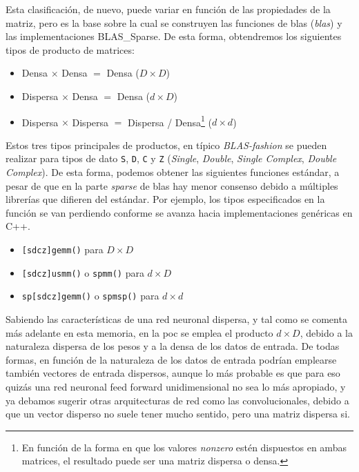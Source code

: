 Esta clasificación, de nuevo, puede variar en función de las propiedades de la matriz, pero es la base sobre la cual se construyen las funciones de \acrshort{blas} (\textit{\acrlong{blas}}) y las implementaciones BLAS\_Sparse. De esta forma, obtendremos los siguientes tipos de producto de matrices:

\begin{itemize}
    \item Densa $\times$ Densa $=$ Densa ($D\times D$)
    \item Dispersa $\times$ Densa $=$ Densa ($d\times D$)
    \item Dispersa $\times$ Dispersa $=$ Dispersa / Densa\footnote{En función de la forma en que los valores \textit{nonzero} estén dispuestos en ambas matrices, el resultado puede ser una matriz dispersa o densa.} ($d\times d$)
\end{itemize}

Estos tres tipos principales de productos, en típico \textit{BLAS-fashion} se pueden realizar para tipos de dato \texttt{S}, \texttt{D}, \texttt{C} y \texttt{Z} (\textit{Single}, \textit{Double}, \textit{Single Complex}, \textit{Double Complex}).
De esta forma, podemos obtener las siguientes funciones estándar, a pesar de que en la parte \textit{sparse} de \acrshort{blas} hay menor consenso debido a múltiples librerías que difieren del estándar. Por ejemplo, los tipos especificados en la función se van perdiendo conforme se avanza hacia implementaciones genéricas en C++.

\begin{itemize}
    \item \texttt{[sdcz]gemm()} para $D\times D$
    \item \texttt{[sdcz]usmm()} o \texttt{spmm()} para $d\times D$
    \item \texttt{sp[sdcz]gemm()} o \texttt{spmsp()} para $d\times d$
\end{itemize}

Sabiendo las características de una red neuronal dispersa, y tal como se comenta más adelante en esta memoria, en la \acrshort{poc} se emplea el producto $d\times D$, debido a la naturaleza dispersa de los pesos y a la densa de los datos de entrada. De todas formas, en función de la naturaleza de los datos de entrada podrían emplearse también vectores de entrada dispersos, aunque lo más probable es que para eso quizás una red neuronal feed forward unidimensional no sea lo más apropiado, y ya debamos sugerir otras arquitecturas de red como las convolucionales, debido a que un vector disperso no suele tener mucho sentido, pero una matriz dispersa si.

